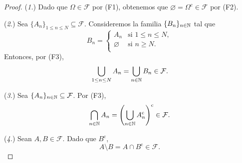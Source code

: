 \begin{proof}
    (\textit{1.}) Dado que $\Omega \in \mathcal{F}$ por (F1), obtenemos que $\varnothing = \Omega^{\textrm{c}} \in \mathcal{F}$ por (F2).

    (\textit{2.}) Sea $\{A_n\}_{1 \leq n \leq N} \subseteq \mathcal{F}$. Consideremos la familia $\{B_n\}_{n \in \mathbb{N}}$ tal que 
    \begin{equation*}
        B_n = \begin{cases}
            A_n & \text{si } 1 \leq n \leq N, \\
            \varnothing & \text{si } n \geq N. \\
        \end{cases}
    \end{equation*}
    Entonces, por (F3),
    \begin{equation*}
        \bigcup_{1 \leq n \leq N} A_n = \bigcup_{n \in \mathbb{N}} B_n \in \mathcal{F}.
    \end{equation*}

    (\textit{3.}) Sea $\{A_n\}_{n \in \mathbb{N}} \subseteq \mathcal{F}$. Por (F3),
    \begin{equation*}
        \bigcap_{n \in \mathbb{N}} A_n = \left(\bigcup_{n \in \mathbb{N}} A_n^{\mathrm{c}}\right)^{\textrm{c}} \in \mathcal{F}.
    \end{equation*}

    (\textit{4.}) Sean $A, B \in \mathcal{F}$. Dado que $B^{\mathrm{c}}$,
    \begin{equation*}
        A \setminus B = A \cap B^{\mathrm{c}} \in \mathcal{F}.
    \end{equation*}
\end{proof}

